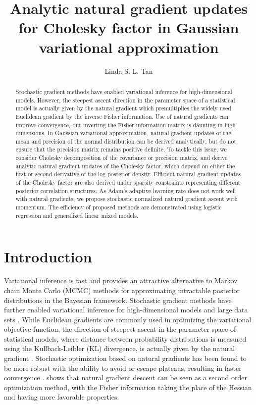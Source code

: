 \documentclass{statsoc}
\title[Natural gradient updates in Gaussian variational approximation]{Analytic natural gradient updates for Cholesky factor in Gaussian variational approximation}
\author[Linda Tan]{Linda S. L. Tan}
\begin{document}
\begin{abstract}
Stochastic gradient methods have enabled variational inference for high-dimensional models. However, the steepest ascent direction in the parameter space of a statistical model is actually given by the natural gradient which premultiplies the widely used Euclidean gradient by the inverse Fisher information. Use of natural gradients can improve convergence, but inverting the Fisher information matrix is daunting in high-dimensions. In Gaussian variational approximation, natural gradient updates of the mean and precision of the normal distribution can be derived analytically, but do not ensure that the precision matrix remains positive definite. To tackle this issue, we consider Cholesky decomposition of the covariance or precision matrix, and derive analytic natural gradient updates of the Cholesky factor, which depend on either the first or second derivative of the log posterior density. Efficient natural gradient updates of the Cholesky factor are also derived under sparsity constraints representing different posterior correlation structures. As Adam's adaptive learning rate does not work well with natural gradients, we propose stochastic normalized natural gradient ascent with momentum. The efficiency of proposed methods are demonstrated using logistic regression and generalized linear mixed models.
\end{abstract}



\section{Introduction}
Variational inference is fast and provides an attractive alternative to Markov chain Monte Carlo (MCMC) methods for approximating intractable posterior distributions in the Bayesian framework. Stochastic gradient methods \citep{Robbins1951} have further enabled variational inference for high-dimensional models and large data sets \citep{Hoffman2013, Salimans2013}. While Euclidean gradients are commonly used in optimizing the variational objective function, the direction of steepest ascent in the parameter space of statistical models, where distance between probability distributions is measured using the Kullback-Leibler (KL) divergence, is actually given by the natural gradient \citep{Amari1998}. Stochastic optimization based on natural gradients has been found to be more robust with the ability to avoid or escape plateaus, resulting in faster convergence \citep{Rattray1998}. \cite{Martens2020} shows that natural gradient descent can be seen as a second order optimization method, with the Fisher information taking the place of the Hessian and having  more favorable properties.
\end{document}
